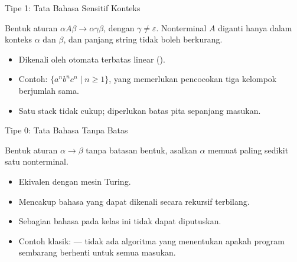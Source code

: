 \documentclass[aspectratio=169,10pt,t]{beamer}
\begin{document}
\begin{frame}{Tipe 1: Tata Bahasa Sensitif Konteks}
  \begin{block}{Bentuk aturan}
    \small
    \(\alpha A\beta \to \alpha\gamma\beta\), dengan
    \(\gamma \neq \varepsilon\). Nonterminal \(A\) diganti hanya dalam
    konteks \(\alpha\) dan \(\beta\), dan panjang string tidak boleh
    berkurang.
  \end{block}

  \begin{itemize}
    \item Dikenali oleh otomata terbatas linear
          ().
    \item Contoh: \(\{a^n b^n c^n \mid n \ge 1\}\), yang memerlukan
          pencocokan tiga kelompok berjumlah sama.
    \item Satu stack tidak cukup; diperlukan batas pita sepanjang
          masukan.
  \end{itemize}
\end{frame}

\begin{frame}{Tipe 0: Tata Bahasa Tanpa Batas}
  \begin{block}{Bentuk aturan}
    \small
    \(\alpha \to \beta\) tanpa batasan bentuk, asalkan \(\alpha\)
    memuat paling sedikit satu nonterminal.
  \end{block}

  \begin{itemize}
    \item Ekivalen dengan mesin Turing.
    \item Mencakup bahasa yang dapat dikenali secara rekursif
          terbilang.
    \item Sebagian bahasa pada kelas ini tidak dapat diputuskan.
    \item Contoh klasik:  --- tidak ada algoritma
          yang menentukan apakah program sembarang berhenti untuk semua
          masukan.
  \end{itemize}
\end{frame}
\end{document}
